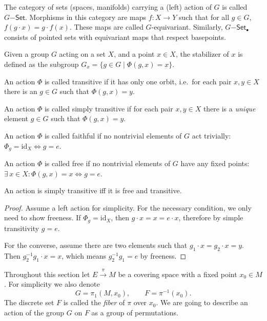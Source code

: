\begin{defn}
    The category of sets (spaces, manifolds) carrying a (left) action of $G$ is called $G\mathsf{-Set}$. Morphisms in this category are maps $f:X\to Y$ such that for all $g\in G$, $f(g\cdot x)=g\cdot f(x)$. These maps are called $G$-equivariant. Similarly, $G\mathsf{-Set}_\bullet$ consists of pointed sets with equivariant maps that respect basepoints. 
\end{defn}
\begin{defn}[Stabilizer]
    Given a group $G$ acting on a set $X$, and a point $x\in X$, the stabilizer of $x$ is defined as the subgroup $G_x=\{g\in G\mid \Phi(g,x)=x\}$.
\end{defn}
\begin{defn}
    An action $\Phi$ is called transitive if it has only one orbit, i.e.\ for each pair $x,y\in X$ there is an $g\in G$ such that $\Phi(g,x)=y$.
\end{defn}
\begin{defn}
    An action $\Phi$ is called simply transitive if for each pair $x,y\in X$ there is a \emph{unique} element $g\in G$ such that $\Phi(g,x)=y$.
\end{defn}
\begin{defn}
    An action $\Phi$ is called faithful if no nontrivial elements of $G$ act trivially: $\Phi_g=\mathrm{id}_X \Leftrightarrow g=e$.
\end{defn}
\begin{defn}
    An action $\Phi$ is called free if no nontrivial elements of $G$ have any fixed points: $\exists\,x\in X: \Phi(g,x)=x\Leftrightarrow g=e$. 
\end{defn}
\begin{prop}
    An action is simply transitive iff it is free and transitive.
\end{prop}
\begin{proof}
    Assume a left action for simplicity. For the necessary condition, we only need to show freeness. If $\Phi_g=\mathrm{id}_X$, then $g\cdot x=x=e\cdot x$, therefore by simple transitivity $g=e$.

    For the converse, assume there are two elements such that $g_1\cdot x=g_2\cdot x=y$. Then $g_2^{-1}g_1\cdot x=x$, which means $g_2^{-1}g_1=e$ by freeness.
\end{proof}

Throughout this section let $E\overset{\pi}{\to}M$ be a covering space with a fixed point $x_0\in M$. For simplicity we also denote
\[G=\pi_1(M,x_0),\quad \quad F=\pi^{-1}(x_0).\]
The discrete set $F$ is called the \emph{fiber} of $\pi$ over $x_0$. We are going to describe an action of the group $G$ on $F$ as a group of permutations. 


